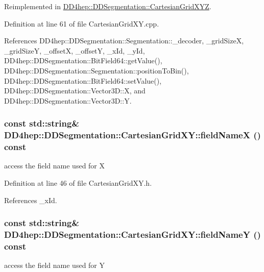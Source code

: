 Reimplemented in \hyperlink{class_d_d4hep_1_1_d_d_segmentation_1_1_cartesian_grid_x_y_z_a50e24896d0efee32af5349b3c69d4866}{DD4hep::DDSegmentation::CartesianGridXYZ}.

Definition at line 61 of file CartesianGridXY.cpp.

References DD4hep::DDSegmentation::Segmentation::\_\-decoder, \_\-gridSizeX, \_\-gridSizeY, \_\-offsetX, \_\-offsetY, \_\-xId, \_\-yId, DD4hep::DDSegmentation::BitField64::getValue(), DD4hep::DDSegmentation::Segmentation::positionToBin(), DD4hep::DDSegmentation::BitField64::setValue(), DD4hep::DDSegmentation::Vector3D::X, and DD4hep::DDSegmentation::Vector3D::Y.\hypertarget{class_d_d4hep_1_1_d_d_segmentation_1_1_cartesian_grid_x_y_aeeb4c3dc46456163440cd44b620b7401}{
\subsubsection[{fieldNameX}]{\setlength{\rightskip}{0pt plus 5cm}const std::string\& DD4hep::DDSegmentation::CartesianGridXY::fieldNameX () const}}
\label{class_d_d4hep_1_1_d_d_segmentation_1_1_cartesian_grid_x_y_aeeb4c3dc46456163440cd44b620b7401}


access the field name used for X 

Definition at line 46 of file CartesianGridXY.h.

References \_\-xId.\hypertarget{class_d_d4hep_1_1_d_d_segmentation_1_1_cartesian_grid_x_y_afb4f3202e5bff1c535f5a97051decb83}{
\subsubsection[{fieldNameY}]{\setlength{\rightskip}{0pt plus 5cm}const std::string\& DD4hep::DDSegmentation::CartesianGridXY::fieldNameY () const}}
\label{class_d_d4hep_1_1_d_d_segmentation_1_1_cartesian_grid_x_y_afb4f3202e5bff1c535f5a97051decb83}


access the field name used for Y 

